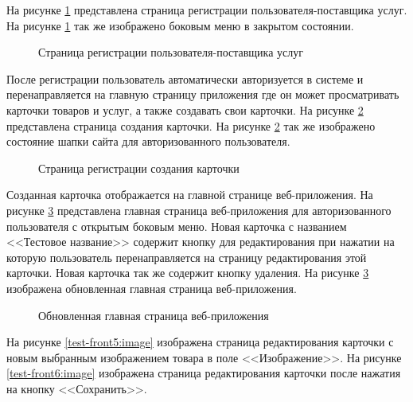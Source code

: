 На рисунке \ref{test-front2:image} представлена страница регистрации пользователя-поставщика услуг. На рисунке \ref{test-front2:image} так же изображено боковым меню в закрытом состоянии.

\newpage %
\begin{figure}[H] %
\caption{Страница регистрации пользователя-поставщика услуг}
\label{test-front2:image}
\end{figure}

После регистрации пользователь автоматически авторизуется в системе и перенаправляется на главную страницу приложения где он может просматривать карточки товаров и услуг, а также создавать свои карточки. На рисунке \ref{test-front3:image} представлена страница создания карточки. На рисунке \ref{test-front3:image} так же изображено состояние шапки сайта для авторизованного пользователя.

\newpage %
\begin{figure}[H] %
\caption{Страница регистрации создания карточки}
\label{test-front3:image}
\end{figure}

Созданная карточка отображается на главной странице веб-приложения. На рисунке \ref{test-front4:image} представлена главная страница веб-приложения для авторизованного пользователя с открытым боковым меню. Новая карточка с названием <<Тестовое название>> содержит кнопку для редактирования при нажатии на которую пользователь перенаправляется на страницу редактирования этой карточки. Новая карточка так же содержит кнопку удаления. На рисунке \ref{test-front4:image} изображена обновленная главная страница веб-приложения.

\newpage %
\begin{figure}[H] %
\caption{Обновленная главная страница веб-приложения}
\label{test-front4:image}
\end{figure}

На рисунке \ref{test-front5:image} изображена страница редактирования карточки с новым выбранным изображением товара в поле <<Изображение>>. На рисунке \ref{test-front6:image} изображена страница редактирования карточки после нажатия на кнопку <<Сохранить>>.

